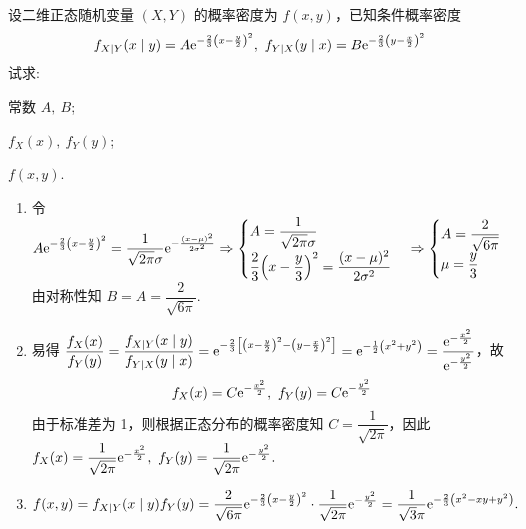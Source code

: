 \begin{example}
    设二维正态随机变量 $(X,Y)$ 的概率密度为 $f(x,y)$，已知条件概率密度 $$f_{X\mid Y}(x\mid y)=A\mathrm{e}^{-\frac{2}{3}\qty(x-\frac{y}{2})^2},~f_{Y\mid X}(y\mid x)=B\mathrm{e}^{-\frac{2}{3}\qty(y-\frac{x}{2})^2}$$
    试求: \begin{enumerate*}[label=(\arabic{*})]
        \item 常数 $A,~B$;
        \item $f_X(x),~f_Y(y)$;
        \item $f(x,y)$.
    \end{enumerate*}
\end{example}
\begin{solution}
    \begin{enumerate}[label=(\arabic{*})]
        \item 令 $\displaystyle A\mathrm{e}^{-\frac{2}{3}\qty(x-\frac{y}{2})^2}=\dfrac{1}{\sqrt{2\pi}\sigma}\mathrm{e}^{-\frac{(x-\mu)^2}{2\sigma^2}}\Rightarrow \begin{cases}
            A=\dfrac{1}{\sqrt{2\pi}\sigma}\\[6pt]
            \dfrac{2}{3}\qty(x-\dfrac{y}{3})^2=\dfrac{(x-\mu)^2}{2\sigma^2}
        \end{cases}\Rightarrow\begin{cases}
            A=\dfrac{2}{\sqrt{6\pi}}\\[6pt]
            \mu=\dfrac{y}{3}
        \end{cases}$ 由对称性知 $B=A=\dfrac{2}{\sqrt{6\pi}}.$
        \item 易得 $\dfrac{f_X(x)}{f_Y(y)}=\dfrac{f_{X\mid Y}(x\mid y)}{f_{Y\mid X}(y\mid x)}=\mathrm{e}^{-\frac{2}{3}\qty[\qty(x-\frac{y}{2})^2-\qty(y-\frac{x}{2})^2]}=\mathrm{e}^{-\frac{1}{2}\qty(x^2+y^2)}=\dfrac{\mathrm{e}^{-\frac{x^2}{2}}}{\mathrm{e}^{-\frac{y^2}{2}}}$，故 $$f_X(x)=C\mathrm{e}^{-\frac{x^2}{2}},~f_Y(y)=C\mathrm{e}^{-\frac{y^2}{2}}$$
        由于标准差为 1，则根据正态分布的概率密度知 $C=\dfrac{1}{\sqrt{2\pi}}$，因此 $f_X(x)=\dfrac{1}{\sqrt{2\pi}}\mathrm{e}^{-\frac{x^2}{2}},~f_Y(y)=\dfrac{1}{\sqrt{2\pi}}\mathrm{e}^{-\frac{y^2}{2}}.$
        \item $f(x,y)=f_{X\mid Y}(x\mid y)f_Y(y)=\dfrac{2}{\sqrt{6\pi}}\mathrm{e}^{-\frac{2}{3}\qty(x-\frac{y}{2})^2}\cdot \dfrac{1}{\sqrt{2\pi}}\mathrm{e}^{-\frac{y^2}{2}}=\dfrac{1}{\sqrt{3}\pi}\mathrm{e}^{-\frac{2}{3}\qty(x^2-xy+y^2)}.$
    \end{enumerate}
\end{solution}

